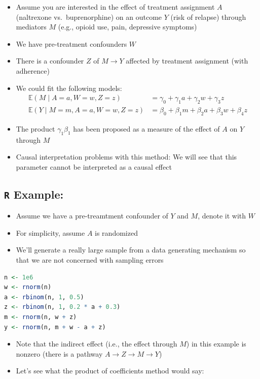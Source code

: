 \documentclass[
  12pt,
]{book}
\providecommand{\tightlist}{%
  \setlength{\itemsep}{0pt}\setlength{\parskip}{0pt}}
\theoremstyle{definition}
\theoremstyle{definition}
\theoremstyle{definition}
\newcommand{\E}{\mathbb{E}}
\newcommand{\1}{\mathbbm{1}}
\begin{document}
\begin{itemize}
\tightlist
\item
  Assume you are interested in the effect of treatment assignment \(A\)
  (naltrexone vs.~buprenorphine) on an outcome \(Y\) (risk of relapse) through
  mediators \(M\) (e.g., opioid use, pain, depressive symptoms)
\item
  We have pre-treatment confounders \(W\)
\item
  There is a confounder \(Z\) of \(M \rightarrow Y\) affected by treatment
  assignment (with adherence)
\item
  We could fit the following models:
  \begin{align}
      \E(M \mid A=a, W=w, Z=z) & = \gamma_0 + \gamma_1 a + \gamma_2 w + \gamma_3 z \\
      \E(Y \mid M=m, A=a, W=w, Z=z) & = \beta_0 + \beta_1 m + \beta_2 a + \beta_3 w + \beta_4 z
    \end{align}
\item
  The product \(\gamma_1 \beta_1\) has been proposed as a measure of the effect
  of \(A\) on \(Y\) through \(M\)
\item
  Causal interpretation problems with this method: We will see that this
  parameter cannot be interpreted as a causal effect
\end{itemize}

\hypertarget{r-example}{%
\subsection{\texorpdfstring{\texttt{R} Example:}{R Example:}}\label{r-example}}

\begin{itemize}
\tightlist
\item
  Assume we have a pre-treamtment confounder of \(Y\) and \(M\), denote it with \(W\)
\item
  For simplicity, assume \(A\) is randomized
\item
  We'll generate a really large sample from a data generating mechanism so that
  we are not concerned with sampling errors
\end{itemize}

\begin{lstlisting}[language=R]
n <- 1e6
w <- rnorm(n)
a <- rbinom(n, 1, 0.5)
z <- rbinom(n, 1, 0.2 * a + 0.3)
m <- rnorm(n, w + z)
y <- rnorm(n, m + w - a + z)
\end{lstlisting}

\begin{itemize}
\tightlist
\item
  Note that the indirect effect (i.e., the effect through \(M\)) in this example
  is nonzero (there is a pathway \(A \rightarrow Z \rightarrow M \rightarrow Y\))
\item
  Let's see what the product of coefficients method would say:
\end{itemize}
\end{document}
